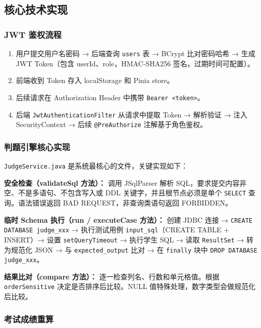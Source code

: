 \documentclass[12pt,a4paper]{ctexart}
\begin{document}
\subsection{核心技术实现}

\subsubsection*{JWT 鉴权流程}

\begin{enumerate}[leftmargin=2em]
  \item 用户提交用户名密码 → 后端查询 \texttt{users} 表 → BCrypt 比对密码哈希 → 生成 JWT Token（包含 userId、role，HMAC-SHA256 签名，过期时间可配置）。
  \item 前端收到 Token 存入 localStorage 和 Pinia store。
  \item 后续请求在 Authorization Header 中携带 \texttt{Bearer <token>}。
  \item 后端 \texttt{JwtAuthenticationFilter} 从请求中提取 Token → 解析验证 → 注入 SecurityContext → 后续 \texttt{@PreAuthorize} 注解基于角色鉴权。
\end{enumerate}

\subsubsection*{判题引擎核心实现}

\texttt{JudgeService.java} 是系统最核心的文件，关键实现如下：

\textbf{安全检查（validateSql 方法）：} 调用 JSqlParser 解析 SQL，要求提交内容非空、不是多语句、不包含写入或 DDL 关键字，并且根节点必须是单个 \texttt{SELECT} 查询。语法错误返回 BAD REQUEST，非查询类语句返回 FORBIDDEN。

\textbf{临时 Schema 执行（run / executeCase 方法）：} 创建 JDBC 连接 → \texttt{CREATE DATABASE judge\_xxx} → 执行测试用例 \texttt{input\_sql}（CREATE TABLE + INSERT）→ 设置 \texttt{setQueryTimeout} → 执行学生 SQL → 读取 \texttt{ResultSet} → 转为规范化 JSON → 与 \texttt{expected\_output} 比对 → 在 \texttt{finally} 块中 \texttt{DROP DATABASE judge\_xxx}。

\textbf{结果比对（compare 方法）：} 逐一检查列名、行数和单元格值。根据 \texttt{orderSensitive} 决定是否排序后比较。NULL 值特殊处理，数字类型会做规范化后比较。

\subsubsection*{考试成绩重算}
\end{document}
